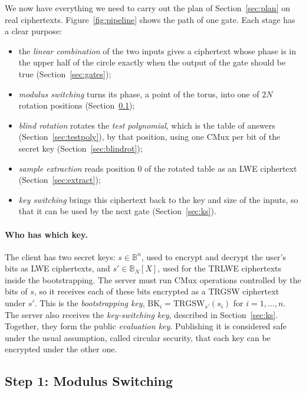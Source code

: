 \documentclass[12pt]{article}
\theoremstyle{plain}
\theoremstyle{definition}
\newcommand{\B}{\mathbb{B}}
\newcommand{\BN}{\B_N[X]}
\newcommand{\BK}{\mathrm{BK}}
\begin{document}
We now have everything we need to carry out the plan of
Section~\ref{sec:plan} on real ciphertexts. Figure~\ref{fig:pipeline} shows the
path of one gate. Each stage has a clear purpose:
\begin{itemize}
  \item the \emph{linear combination} of the two inputs gives a ciphertext whose
        phase is in the upper half of the circle exactly when the output of the
        gate should be \textsf{true} (Section~\ref{sec:gates});
  \item \emph{modulus switching} turns its phase, a point of the torus, into one
        of $2N$ rotation positions (Section~\ref{sec:modswitch});
  \item \emph{blind rotation} rotates the \emph{test polynomial}, which is the
        table of answers (Section~\ref{sec:testpoly}), by that position, using
        one CMux per bit of the secret key (Section~\ref{sec:blindrot});
  \item \emph{sample extraction} reads position $0$ of the rotated table as an
        LWE ciphertext (Section~\ref{sec:extract});
  \item \emph{key switching} brings this ciphertext back to the key and size of
        the inputs, so that it can be used by the next gate
        (Section~\ref{sec:ks}).
\end{itemize}

\paragraph{Who has which key.}
The client has two secret keys: $s\in\B^n$, used to encrypt and decrypt the
user's bits as LWE ciphertexts, and $s'\in\BN$, used for the TRLWE ciphertexts
inside the bootstrapping. The server must run CMux operations controlled by
the bits of $s$, so it receives each of these bits encrypted as a TRGSW
ciphertext under $s'$. This is the \emph{bootstrapping key},
$\BK_i=\mathrm{TRGSW}_{s'}(s_i)$ for $i=1,\dots,n$. The server also receives the
\emph{key-switching key}, described in Section~\ref{sec:ks}. Together, they form
the public \emph{evaluation key}. Publishing it is considered safe under the
usual assumption, called circular security, that each key can be encrypted
under the other one.



\subsection{Step 1: Modulus Switching}
\label{sec:modswitch}
\end{document}
